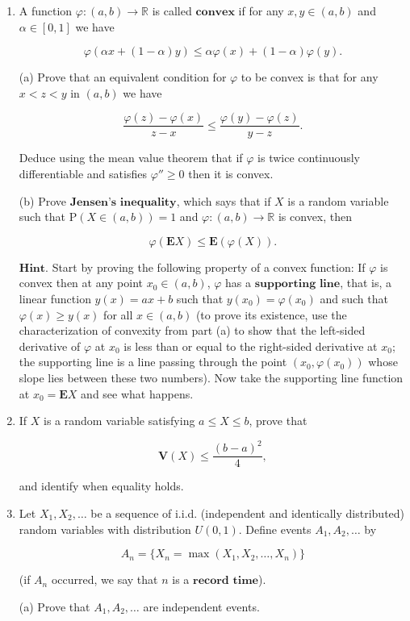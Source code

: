 \documentclass[11pt]{report}
\newcommand{\R}{\mathbb{R}}
\theoremstyle{plain}
\theoremstyle{definition}
\begin{document}
\begin{enumerate}[label=\arabic*.]
\item A function $\varphi:(a,b)\to\R$ is called
$\textbf{convex}$ if for any $x,y\in (a,b)$ and
$\alpha\in [0,1]$ we have

\[
\varphi(\alpha x + (1-\alpha)y) \le \alpha \varphi(x) + (1-\alpha) \varphi(y).
\]

(a) Prove that an equivalent condition for $\varphi$
to be convex is that for any $x<z<y$ in $(a,b)$ we
have

\[
\frac{\varphi(z)-\varphi(x)}{z-x} \le \frac{\varphi(y)-\varphi(z)}{y-z}.
\]

Deduce using the mean value theorem that if $\varphi$
is twice continuously differentiable and satisfies
$\varphi''\ge 0$ then it is convex.

(b) Prove $\textbf{Jensen's inequality}$, which says
that if $X$ is a random variable such that
$\mathrm{P}(X\in (a,b))=1$ and $\varphi:(a,b)\to\R$
is convex, then

\[
\varphi(\mathbf{E}X) \le \mathbf{E}(\varphi(X)).
\]

$\textbf{Hint.}$ Start by proving the following
property of a convex function: If $\varphi$ is convex
then at any point $x_0\in (a,b)$, $\varphi$ has a
$\textbf{supporting line}$, that is, a linear
function $y(x)=ax+b$ such that $y(x_0)=\varphi(x_0)$
and such that $\varphi(x)\ge y(x)$ for all $x\in(a,b)$
(to prove its existence, use the characterization of
convexity from part (a) to show that the left-sided
derivative of $\varphi$ at $x_0$ is less than or
equal to the right-sided derivative at $x_0$; the
supporting line is a line passing through the point
$(x_0,\varphi(x_0))$ whose slope lies between these
two numbers). Now take the supporting line function at
$x_0=\mathbf{E}X$ and see what happens.

\item If $X$ is a random variable satisfying $a\le X\le b$,
prove that

\[
\mathbf{V}(X) \le \frac{(b-a)^2}{4},
\]

and identify when equality holds.

\item Let $X_1, X_2, \ldots$ be a sequence of i.i.d.
(independent and identically distributed) random
variables with distribution $U(0,1)$. Define events
$A_1, A_2, \ldots$ by

\[
A_n = \{ X_n = \max(X_1,X_2,\ldots,X_n) \}
\]

(if $A_n$ occurred, we say that $n$ is a
$\textbf{record time}$).

(a) Prove that $A_1,A_2,\ldots$ are independent
events.


\end{enumerate}
\end{document}
